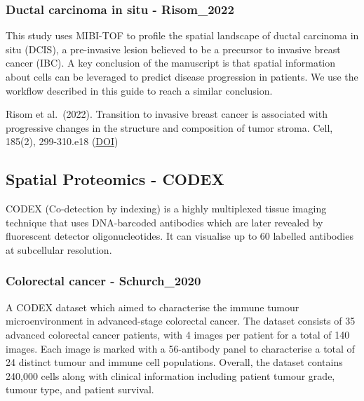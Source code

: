 \documentclass[
  letterpaper,
  DIV=11,
  numbers=noendperiod]{scrreprt}
\begin{document}
\subsubsection*{Ductal carcinoma in situ -
Risom\_2022}\label{ductal-carcinoma-in-situ---risom_2022}

This study uses MIBI-TOF to profile the spatial landscape of ductal
carcinoma in situ (DCIS), a pre-invasive lesion believed to be a
precursor to invasive breast cancer (IBC). A key conclusion of the
manuscript is that spatial information about cells can be leveraged to
predict disease progression in patients. We use the workflow described
in this guide to reach a similar conclusion.

Risom et al.~(2022). Transition to invasive breast cancer is associated
with progressive changes in the structure and composition of tumor
stroma. Cell, 185(2), 299-310.e18
(\href{https://doi.org/10.1016/j.cell.2021.12.023}{DOI})

\subsection*{Spatial Proteomics -
CODEX}\label{spatial-proteomics---codex}

CODEX (Co-detection by indexing) is a highly multiplexed tissue imaging
technique that uses DNA-barcoded antibodies which are later revealed by
fluorescent detector oligonucleotides. It can visualise up to 60
labelled antibodies at subcellular resolution.

\subsubsection*{Colorectal cancer -
Schurch\_2020}\label{colorectal-cancer---schurch_2020}

A CODEX dataset which aimed to characterise the immune tumour
microenvironment in advanced-stage colorectal cancer. The dataset
consists of 35 advanced colorectal cancer patients, with 4 images per
patient for a total of 140 images. Each image is marked with a
56-antibody panel to characterise a total of 24 distinct tumour and
immune cell populations. Overall, the dataset contains 240,000 cells
along with clinical information including patient tumour grade, tumour
type, and patient survival.
\end{document}
